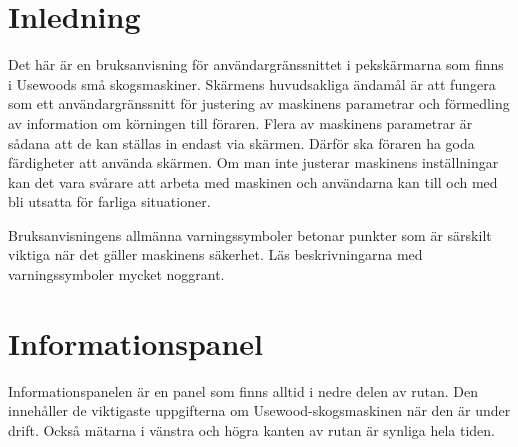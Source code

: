 \documentclass[12pt,a4paper,finnish]{uvmanual}
\begin{document}





\renewcommand\contentsname{Innehållsförteckning}         %
\setcounter{tocdepth}{2}                      %
\tableofcontents                              %

\cleardoublepage

\newpage             %
\setcounter{page}{1} %
\renewcommand{\chaptername}{} %

\chapter{Inledning}

Det här är en bruksanvisning för användargränssnittet i pekskärmarna som finns i Usewoods små skogsmaskiner.  Skärmens huvudsakliga ändamål är att fungera som ett användargränssnitt för justering av maskinens parametrar och förmedling av information om körningen till föraren. Flera av maskinens parametrar är sådana att de kan ställas in endast via skärmen. Därför ska föraren ha goda färdigheter att använda skärmen. Om man inte justerar maskinens inställningar kan det vara svårare att arbeta med maskinen och användarna kan till och med bli utsatta för farliga situationer.

{Bruksanvisningens allmänna varningssymboler betonar punkter som är särskilt viktiga när det gäller maskinens säkerhet. Läs beskrivningarna med varningssymboler mycket noggrant.}

\chapter{Informationspanel}\label{ch:taskbar}
Informationspanelen är en panel som finns alltid i nedre delen av rutan. Den innehåller de viktigaste uppgifterna om Usewood-skogsmaskinen när den är under drift. Också mätarna i vänstra och högra kanten av rutan är synliga hela tiden.
\end{document}
